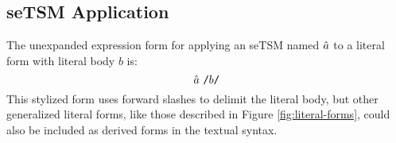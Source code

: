 
\subsection{seTSM Application}\label{sec:U-uetsm-application}
The unexpanded expression form for applying an seTSM named $\hat{a}$ to a literal form with literal body $b$ is:
\[
\hat{a}~\texttt{/}b\texttt{/}
\] 
This stylized form uses forward slashes to delimit the literal body, but other generalized literal forms, like those described in Figure \ref{fig:literal-forms}, could also be included as derived forms in the textual syntax. %

